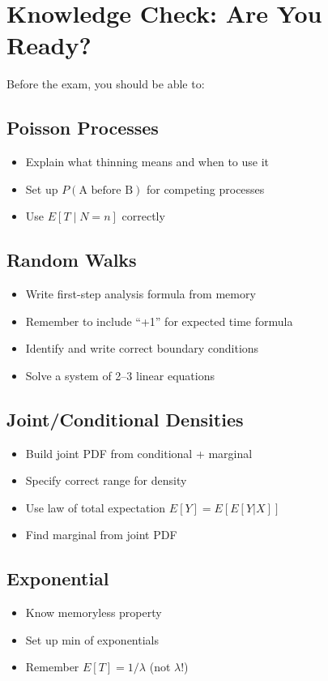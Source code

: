\documentclass[11pt,letterpaper]{article}
\begin{document}
\section{Knowledge Check: Are You Ready?}

Before the exam, you should be able to:

\subsection{Poisson Processes}
\begin{itemize}[leftmargin=*]
  \item[$\square$] Explain what thinning means and when to use it
  \item[$\square$] Set up $P(\text{A before B})$ for competing processes
  \item[$\square$] Use $E[T \mid N=n]$ correctly
\end{itemize}

\subsection{Random Walks}
\begin{itemize}[leftmargin=*]
  \item[$\square$] Write first-step analysis formula from memory
  \item[$\square$] Remember to include ``+1'' for expected time formula
  \item[$\square$] Identify and write correct boundary conditions
  \item[$\square$] Solve a system of 2--3 linear equations
\end{itemize}

\subsection{Joint/Conditional Densities}
\begin{itemize}[leftmargin=*]
  \item[$\square$] Build joint PDF from conditional + marginal
  \item[$\square$] Specify correct range for density
  \item[$\square$] Use law of total expectation $E[Y] = E[E[Y|X]]$
  \item[$\square$] Find marginal from joint PDF
\end{itemize}

\subsection{Exponential}
\begin{itemize}[leftmargin=*]
  \item[$\square$] Know memoryless property
  \item[$\square$] Set up min of exponentials
  \item[$\square$] Remember $E[T] = 1/\lambda$ (not $\lambda$!)
\end{itemize}
\end{document}
